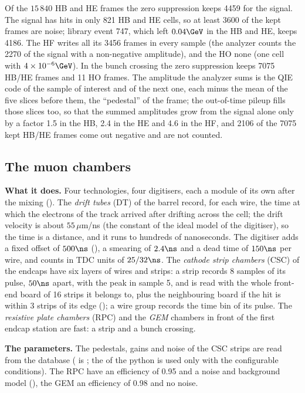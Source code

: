 Of the $15\,840$ HB and HE frames the zero suppression keeps 4459 for the signal. The signal has hits in only 821 HB and
HE cells, so at least 3600 of the kept frames are noise; library event 747, which left $0.04\GeV$ in the HB and HE,
keeps 4186. The HF writes all its 3456 frames in every sample (the analyzer counts the 2270 of the signal with a
non-negative amplitude), and the HO none (one cell with $4\times10^{-6}\GeV$). In the bunch crossing the zero
suppression keeps 7075 HB/HE frames and 11 HO frames. The amplitude the analyzer sums is the QIE code of the sample of
interest and of the next one, each minus the mean of the five slices before them, the ``pedestal'' of the frame; the
out-of-time pileup fills those slices too, so that the summed amplitudes grow from the signal alone only by a factor 1.5 in the
HB, 2.4 in the HE and 4.6 in the HF, and 2106 of the 7075 kept HB/HE frames come out negative and are not counted.

\FloatBarrier
\subsection{The muon chambers}
\label{sec:11_muon}

\textbf{What it does.} Four technologies, four digitisers, each a module of its own after the mixing
(). The \emph{drift tubes} (DT) of the barrel record, for each wire,
the time at which the electrons of the track arrived after drifting across the cell; the drift velocity is about
$55\,\mu$m/ns (the constant of the ideal model of the digitiser), so the time is a distance, and it runs to hundreds of
nanoseconds. The digitiser adds a fixed offset of $500\ns$ (), a smearing of $2.4\ns$ and a dead
time of $150\ns$ per wire, and counts in TDC units of $25/32\ns$. The \emph{cathode strip chambers} (CSC) of the
endcaps have six layers of wires and strips: a strip records 8 samples of its pulse, $50\ns$ apart, with the peak in
sample 5, and is read with the whole front-end board of 16 strips it belongs to, plus the neighbouring board if the hit
is within 3 strips of its edge (); a wire group records the time bin of its
pulse. The \emph{resistive plate chambers} (RPC) and the \emph{GEM} chambers in front of the first endcap station are
fast: a strip and a bunch crossing.

\textbf{The parameters.} The pedestals, gains and noise of the CSC strips are read from the database
( is ; the  of the python is used only with the configurable conditions). The RPC have an
efficiency of 0.95 and a noise and background model (), the GEM an efficiency of 0.98 and no
noise.

